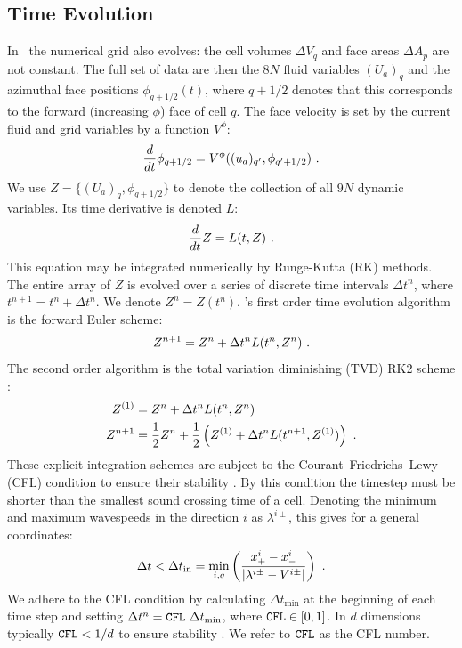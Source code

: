 \subsection{Time Evolution}
In \grdisco\ the numerical grid also evolves: the cell volumes $\Delta V_q$ and face areas $\Delta A_p$ are not constant.  The full set of data are then the $8N$ fluid variables $(U_a)_q$ and the azimuthal face positions $\phi_{q+1/2}(t)$, where $q+1/2$ denotes that this corresponds to the forward (increasing $\phi$) face of cell $q$.  The face velocity is set by the current fluid and grid variables by a function $V^\phi$:
\begin{equation}
	\frac{d}{dt} \phi_{q+1/2} = V^\phi((u_a)_{q'}, \phi_{q'+1/2}) \ . \eqlabel{faceMovement} 
\end{equation}
We use $Z = \{ (U_a)_q, \phi_{q+1/2} \}$ to denote the collection of all $9N$ dynamic variables.  Its time derivative is denoted $L$:
\begin{equation}
	\frac{d}{dt} Z = L(t, Z)\ . \eqlabel{Zevol}
\end{equation}
This equation may be integrated numerically by Runge-Kutta (RK) methods.  The entire array of $Z$ is evolved over a series of discrete time intervals $\Delta t^n$, where $t^{n+1} = t^n + \Delta t^n$. We denote $Z^n = Z(t^n)$.  \grdisco's first order time evolution algorithm is the forward Euler scheme:
\begin{equation}
	Z^{n+1} = Z^n + \Delta t^n L(t^n, Z^n) \ . \eqlabel{fe}
\end{equation}
The second order algorithm is the total variation diminishing (TVD) RK2 scheme \citep{Gottlieb98}:
\begin{align}
	Z^{(1)} &= Z^n + \Delta t^n L(t^n, Z^n) \\
	Z^{n+1} &= \frac{1}{2}Z^n + \frac{1}{2}\left(Z^{(1)} + \Delta t^n L(t^{n+1}, Z^{(1)}) \right) \ . \eqlabel{rk2}
\end{align}
These explicit integration schemes are subject to the Courant--Friedrichs--Lewy (CFL) condition to ensure their stability \citep{CFL28}.  By this condition the timestep must be shorter than the smallest sound crossing time of a cell.  Denoting the minimum and maximum wavespeeds in the direction $i$ as $\lambda^{i\pm}$, this gives for a general coordinates:
\begin{equation}
	\Delta t < \Delta t_{\mathrm{in}} = \underset{i,q}{\min}\left( \frac{x^i_+ - x^i_-}{\left |\lambda^{i\pm} - V^{i\pm}\right |} \right)\ . \eqlabel{CFL}
\end{equation}
We adhere to the CFL condition by calculating $\Delta t_{\mathrm{min}}$ at the beginning of each time step and setting $\Delta t^n = {\tt CFL}\ \Delta t_{\mathrm{min}}$, where ${\tt CFL} \in [0,1]$.  In $d$ dimensions typically ${\tt CFL} < 1/d$ to ensure stability \cite{Toro}.  We refer to ${\tt CFL}$ as the CFL number.

